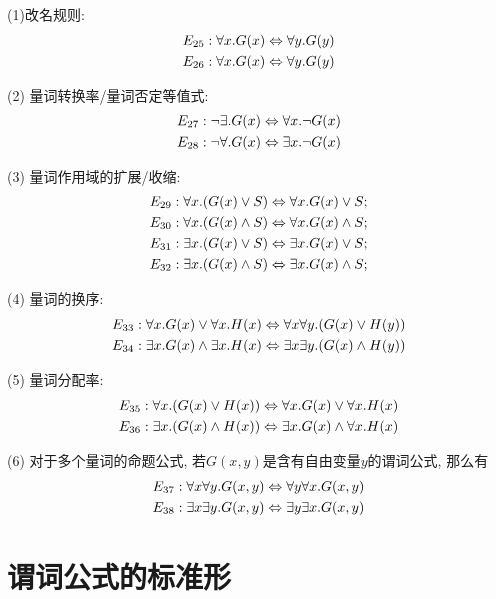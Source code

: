 \begin{theorem}[谓词公式等价的定律]
	(1)改名规则: \begin{align*}E_{25}:\forall x. G(x)\Leftrightarrow \forall y.G(y)\\ E_{26}:\forall x. G(x)\Leftrightarrow \forall y.G(y)\end{align*}
	
	(2) 量词转换率/量词否定等值式: \begin{align*}E_{27}:\lnot \exists. G(x)\Leftrightarrow \forall x. \lnot G(x)\\ E_{28}:\lnot \forall. G(x)\Leftrightarrow \exists x. \lnot G(x)\end{align*}
	
	(3) 量词作用域的扩展/收缩: 
	\begin{align*}
		E_{29}:\forall x.(G(x)\lor S)\Leftrightarrow \forall x. G(x) \lor S;\\
		E_{30}:\forall x.(G(x)\land S)\Leftrightarrow \forall x. G(x) \land S; \\
		E_{31}:\exists x.(G(x)\lor S)\Leftrightarrow \exists x. G(x) \lor S;\\
		E_{32}:\exists x.(G(x)\land S)\Leftrightarrow \exists x. G(x) \land S; 
	\end{align*}
	
	(4) 量词的换序: 
	\begin{align*}
		E_{33}:\forall x.G(x)\lor \forall x. H(x) \Leftrightarrow \forall x \forall y. (G(x)\lor H(y))\\
		E_{34}:\exists x.G(x)\land \exists x. H(x) \Leftrightarrow \exists x \exists y. (G(x)\land H(y))
	\end{align*}
	
	(5) 量词分配率: 
	\begin{align*}
		E_{35}:\forall x.(G(x)\lor H(x))\Leftrightarrow \forall x.G(x)\lor \forall x.H(x)\\
		E_{36}:\exists x.(G(x)\land H(x))\Leftrightarrow \exists x.G(x)\land \forall x.H(x)
	\end{align*}
	
	(6) 对于多个量词的命题公式, 若$G(x,y)$是含有自由变量$y$的谓词公式, 那么有
	\begin{align*}
		E_{37}:\forall x\forall y. G(x,y)\Leftrightarrow \forall y\forall x. G(x,y)\\
		E_{38}:\exists x\exists y. G(x,y)\Leftrightarrow \exists y\exists x. G(x,y)
	\end{align*}
\end{theorem}

\section{谓词公式的标准形}

